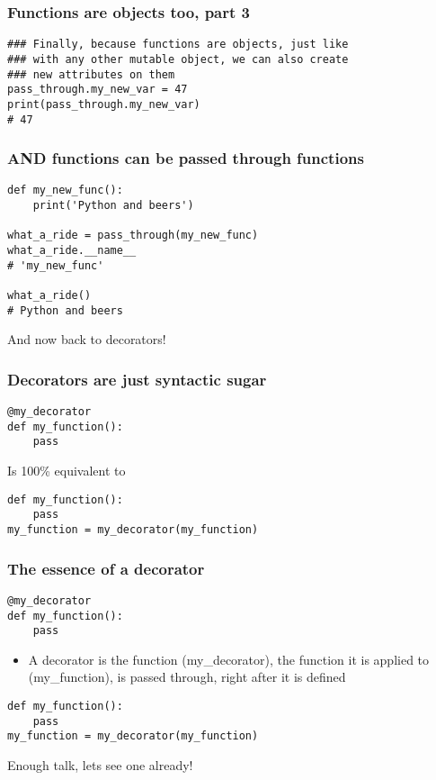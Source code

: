 \documentclass{beamer}
\begin{document}
\begin{frame}[fragile]
  \frametitle{Functions are objects too, part 3}
\begin{verbatim}
### Finally, because functions are objects, just like
### with any other mutable object, we can also create
### new attributes on them
pass_through.my_new_var = 47
print(pass_through.my_new_var)
# 47
\end{verbatim}
\end{frame}

\begin{frame}[fragile]
  \frametitle{AND functions can be passed through functions}
\begin{verbatim}
def my_new_func():
    print('Python and beers')

what_a_ride = pass_through(my_new_func)
what_a_ride.__name__
# 'my_new_func'

what_a_ride()
# Python and beers
\end{verbatim}
\begin{block}{\vspace*{-3ex}}
  And now back to decorators!  
\end{block}
\end{frame}

\begin{frame}[fragile]
  \frametitle{Decorators are just syntactic sugar}
\begin{verbatim}
@my_decorator
def my_function():
    pass
\end{verbatim}
\begin{alertblock}{\vspace*{-3ex}}
  Is 100\% equivalent to
\end{alertblock}
\begin{verbatim}
def my_function():
    pass
my_function = my_decorator(my_function)
\end{verbatim}
\end{frame}

\begin{frame}[fragile]
  \frametitle{The essence of a decorator}
\begin{verbatim}
@my_decorator
def my_function():
    pass
\end{verbatim}
\begin{block}{\vspace*{-3ex}}
\begin{itemize}
\item A decorator is the function (my\_decorator), the function it is applied to (my\_function), is passed through, right after it is defined
\end{itemize}
\end{block}
\begin{verbatim}
def my_function():
    pass
my_function = my_decorator(my_function)
\end{verbatim}
\begin{block}{\vspace*{-3ex}}
  Enough talk, lets see one already!
\end{block}
\end{frame}
\end{document}
